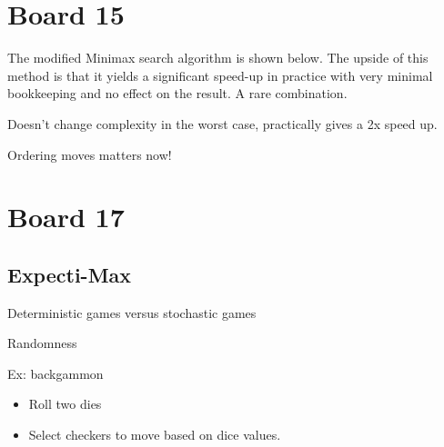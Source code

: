 \documentclass[10pt]{article}
\begin{document}
\section{Board 15}
The modified Minimax search algorithm is shown below.
The upside of this method is that it yields a significant speed-up in practice with very minimal bookkeeping and no effect on the result. A rare combination.

\begin{algorithm}
\begin{algorithmic}[1]

  \EndIf{}
  \EndFor{}
  
  \EndIf{}
  \EndFor{}
  \EndIf{}
  \EndProcedure{}
\end{algorithmic}
\end{algorithm}

Doesn't change complexity in the worst case, practically gives a 2x speed up. 

Ordering moves matters now!


\section{Board 17}

\subsection{Expecti-Max}

Deterministic games versus stochastic games 

Randomness

Ex: backgammon

\begin{itemize}
\item Roll two dies
\item Select checkers to move based on dice values. 
\end{itemize}
\end{document}
